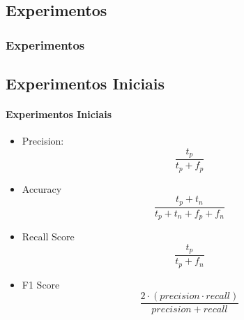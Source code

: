 \documentclass{beamer}
\begin{document}
\begin{frame}
\section{Experimentos} 
\frametitle{Experimentos}
\subsection{Experimentos Iniciais}
\framesubtitle{Experimentos Iniciais}
\begin{itemize}
\item Precision:
\begin{equation}
    \frac{t_p}{t_p + f_p}
\end{equation}
\item Accuracy
\begin{equation}
    \frac{t_p + t_n}{t_p + t_n + f_p + f_n}
\end{equation}
\item Recall Score
\begin{equation}
    \frac{t_p}{t_p + f_n}
\end{equation}
\item F1 Score
\begin{equation}
    \frac{2\cdot(precision\cdot recall)}{precision +  recall}
\end{equation}
\end{itemize}
\end{frame}
\end{document}
